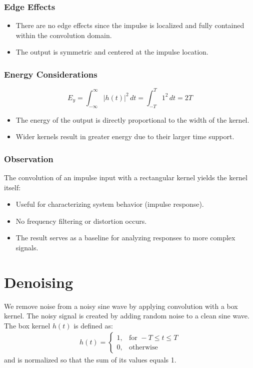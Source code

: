 \documentclass[12pt,a4paper]{report}
\begin{document}
\subsection{Edge Effects}

\begin{itemize}
    \item There are no edge effects since the impulse is localized and fully contained within the convolution domain.
    \item The output is symmetric and centered at the impulse location.
\end{itemize}



\subsection{Energy Considerations}

\[
E_y = \int_{-\infty}^{\infty} |h(t)|^2 \, dt = \int_{-T}^{T} 1^2 \, dt = 2T
\]

\begin{itemize}
    \item The energy of the output is directly proportional to the width of the kernel.
    \item Wider kernels result in greater energy due to their larger time support.
\end{itemize}

\subsection{Observation}

The convolution of an impulse input with a rectangular kernel yields the kernel itself:

\begin{itemize}
    \item Useful for characterizing system behavior (impulse response).
    \item No frequency filtering or distortion occurs.
    \item The result serves as a baseline for analyzing responses to more complex signals.
\end{itemize}
\chapter{Denoising}
We remove noise from a noisy sine wave by applying convolution with a box kernel. The noisy signal is created by adding random noise to a clean sine wave. The box kernel \( h(t) \) is defined as:
\begin{align*}
h(t) = 
\begin{cases}
1, & \text{for } -T \leq t \leq T \\
0, & \text{otherwise}
\end{cases}
\end{align*}
and is normalized so that the sum of its values equals 1.
\end{document}
